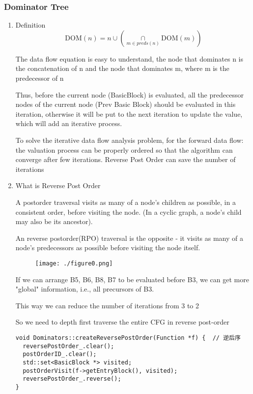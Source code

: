 \documentclass[a4paper]{exam}
\theoremstyle{definition}
\begin{document}
\subsubsection{Dominator Tree \cite{cs153lec23}}
\begin{enumerate}
\item Definition
$$ \text{DOM}(n)={n} \cup\left ( \mathop{\cap}\limits_{m \in preds(n)} \text{DOM}(m) \right) $$

The data flow equation is easy to understand, the node that dominates n is the concatenation of n and the node that dominates m, where m is the predecessor of n

Thus, before the current node (BasicBlock) is evaluated, all the predecessor nodes of the current node (Prev Basic Block) should be evaluated in this iteration, otherwise it will be put to the next iteration to update the value, which will add an iterative process.

To solve the iterative data flow analysis problem, for the forward data flow: the valuation process can be properly ordered so that the algorithm can converge after few iterations. Reverse Post Order can save the number of iterations

\item What is Reverse Post Order

A postorder traversal visits as many of a node’s children as possible, in a consistent order, before visiting the node. (In a cyclic graph, a node’s child may also be its ancestor).

An reverse postorder(RPO) traversal is the opposite - it visits as many of a node’s predecessors as possible before visiting the node itself.
\begin{figure}[htbp]
  \centering
  \texttt{[image: ./figure0.png]}
\end{figure}

If we can arrange B5, B6, B8, B7 to be evaluated before B3, we can get more "global" information, i.e., all precursors of B3.

This way we can reduce the number of iterations from 3 to 2

So we need to depth first traverse the entire CFG in reverse post-order \cite{cooper2001simple}
\begin{verbatim}
void Dominators::createReversePostOrder(Function *f) {  // 逆后序
  reversePostOrder_.clear();
  postOrderID_.clear();
  std::set<BasicBlock *> visited;
  postOrderVisit(f->getEntryBlock(), visited);
  reversePostOrder_.reverse();
}


\end{verbatim}
\end{enumerate}
\end{document}
